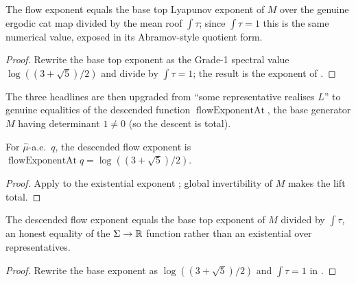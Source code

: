 \begin{theorem}\label{thm:susp-catBaseDiv}
  \leanok
  The flow exponent equals the base top Lyapunov exponent of $M$ over the genuine ergodic cat map
  divided by the mean roof $\int\tau$; since $\int\tau = 1$ this is the same numerical value,
  exposed in its Abramov-style quotient form.
\end{theorem}
\begin{proof}\leanok
  Rewrite the base top exponent as the Grade-1 spectral value $\log((3+\sqrt5)/2)$ and divide by
  $\int\tau = 1$; the result is the exponent of .
\end{proof}

The three headlines are then upgraded from ``some representative realises $L$'' to genuine
equalities of the descended function $\operatorname{flowExponentAt}$, the base generator $M$ having
determinant $1 \ne 0$ (so the descent is total).

\begin{theorem}\label{thm:susp-catFlowExpEq}
  \leanok
  For $\hat\mu$-a.e.\ $q$, the descended flow exponent is
  $\operatorname{flowExponentAt} q = \log((3+\sqrt5)/2)$.
\end{theorem}
\begin{proof}\leanok
  Apply  to the existential exponent ; global
  invertibility of $M$ makes the lift total.
\end{proof}

\begin{theorem}\label{thm:susp-catFlowExpBaseDiv}
  \leanok
  The descended flow exponent equals the base top exponent of $M$ divided by $\int\tau$, an honest
  equality of the $\Sigma \to \mathbb{R}$ function rather than an existential over representatives.
\end{theorem}
\begin{proof}\leanok
  Rewrite the base exponent as $\log((3+\sqrt5)/2)$ and $\int\tau = 1$ in
  .
\end{proof}

